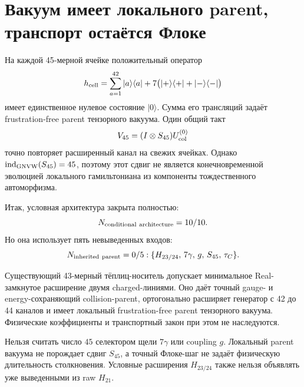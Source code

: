\section{Вакуум имеет локального parent, транспорт остаётся Флоке}

На каждой 45-мерной ячейке положительный оператор
\begin{equation}
 h_{\rm cell}=\sum_{a=1}^{42}|a\rangle\langle a|
 +7\bigl(|+\rangle\langle+|+|-\rangle\langle-|\bigr)
 \label{eq:v8-mediator-dynamic-cell-parent}
\end{equation}
имеет единственное нулевое состояние $|0\rangle$. Сумма его трансляций
задаёт frustration-free parent тензорного вакуума. Один общий такт
\begin{equation}
 V_{45}=(I\otimes S_{45})U_{\rm col}^{(0)}
 \label{eq:v8-mediator-dynamic-floquet-step}
\end{equation}
точно повторяет расширенный канал на свежих ячейках. Однако
$\operatorname{ind}_{\rm GNVW}(S_{45})=45$, поэтому этот сдвиг не является
конечновременной эволюцией локального гамильтониана из компоненты
тождественного автоморфизма.

Итак, условная архитектура закрыта полностью:
\begin{equation}
 N_{\rm conditional\ architecture}=10/10.
 \label{eq:v8-mediator-dynamic-conditional-ledger}
\end{equation}
Но она использует пять невыведенных входов:
\begin{equation}
 N_{\rm inherited\ parent}=0/5:
 \{H_{23/24},\,7\gamma,\,g,\,S_{45},\,\tau_C\}.
 \label{eq:v8-mediator-dynamic-parent-ledger}
\end{equation}

\begin{theorem}
Существующий 43-мерный тёплиц-носитель допускает минимальное Real-замкнутое
расширение двумя charged-линиями. Оно даёт точный gauge- и
energy-сохраняющий collision-parent, ортогонально расширяет генератор с 42
до 44 каналов и имеет локальный frustration-free parent тензорного
вакуума. Физические коэффициенты и транспортный закон при этом не
наследуются.
\end{theorem}

\begin{nogocriterion}
Нельзя считать число $45$ селектором щели $7\gamma$ или coupling $g$.
Локальный parent вакуума не порождает сдвиг $S_{45}$, а точный Флоке-шаг
не задаёт физическую длительность столкновения. Условные расширения
$H_{23/24}$ также нельзя объявлять уже выведенными из raw $H_{21}$.
\end{nogocriterion}


